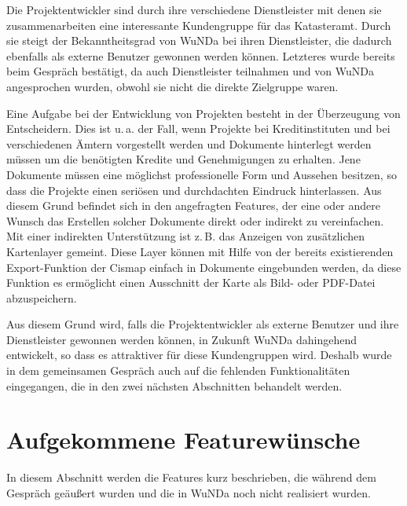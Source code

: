 Die Projektentwickler sind durch ihre verschiedene Dienstleister mit denen sie zusammenarbeiten eine interessante Kundengruppe für das Katasteramt.
Durch sie steigt der Bekanntheitsgrad von \ac{WuNDa} bei ihren Dienstleister, die dadurch ebenfalls als externe Benutzer gewonnen werden können.
Letzteres wurde bereits beim Gespräch bestätigt, da auch Dienstleister teilnahmen und von \ac{WuNDa} angesprochen wurden, obwohl sie nicht die direkte Zielgruppe waren.


Eine Aufgabe bei der Entwicklung von Projekten besteht in der Überzeugung von Entscheidern.
Dies ist u.\,a. der Fall, wenn Projekte bei Kreditinstituten und bei verschiedenen Ämtern vorgestellt werden und Dokumente hinterlegt werden müssen um die benötigten Kredite und Genehmigungen zu erhalten.
Jene Dokumente müssen eine möglichst professionelle Form und Aussehen besitzen, so dass die Projekte einen seriösen und durchdachten Eindruck hinterlassen.
Aus diesem Grund befindet sich in den angefragten Features, der eine oder andere Wunsch das Erstellen solcher Dokumente direkt oder indirekt zu vereinfachen.
Mit einer indirekten Unterstützung ist z.\,B. das Anzeigen von zusätzlichen Kartenlayer gemeint.
Diese Layer können mit Hilfe von der bereits existierenden Export-Funktion der Cismap  einfach in Dokumente eingebunden werden, da diese Funktion es ermöglicht einen Ausschnitt der Karte als Bild- oder PDF-Datei abzuspeichern. 

Aus diesem Grund wird, falls die Projektentwickler als externe Benutzer und ihre Dienstleister gewonnen werden können, in Zukunft \ac{WuNDa} dahingehend entwickelt, so dass es attraktiver für diese Kundengruppen wird.
Deshalb wurde in dem gemeinsamen Gespräch auch auf die fehlenden Funktionalitäten eingegangen, die in den zwei nächsten Abschnitten behandelt werden.

\section{Aufgekommene Featurewünsche}
In diesem Abschnitt werden die Features kurz beschrieben, die während dem Gespräch geäußert wurden und die in \ac{WuNDa} noch nicht realisiert wurden.

